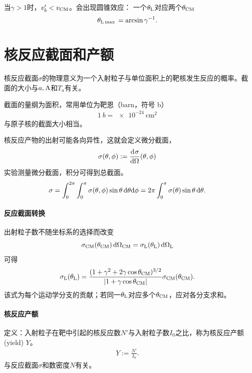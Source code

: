 当$\gamma > 1$时，$v_b' < v_{\mathrm{CM}}$。会出现圆锥效应：
一个$\theta_\mathrm L$对应两个$\theta_{\mathrm{CM}}$
\[
	\theta_{\mathrm L\max{}} = \arcsin\gamma^{-1}.
\]
\begin{notecaptionblock}
\end{notecaptionblock}

\section{核反应截面和产额}
核反应截面$\sigma$的物理意义为一个入射粒子与单位面积上的靶核发生反应的概率。截面的大小与$a,\mathrm{A}$和$T_a$有关。

截面的量纲为面积，常用单位为靶恩（barn，符号 \unit{b}）
\begin{align}
	\qty{1}{b} = \qty{e-24}{\centi\metre\squared}
\end{align}
与原子核的截面大小相当。

核反应产物的出射可能各向异性，这就会定义微分截面，
\begin{align}
	\sigma(\theta,\phi) := \frac{\mathop{}\!\mathrm{d}^{}\sigma}{\mathrm{d}{\Omega}^{}}(\theta,\phi)
\end{align}
实验测量微分截面，积分可得到总截面。
\begin{equation}\label{eq:nrd-integrated-cross-section}
	\sigma = \int_0^{2\pi}\int_0^\pi\sigma(\theta,\phi)\sin\theta\mathop{}\!\mathrm{d}\theta\mathrm{d}\phi = 2\pi\int_0^\pi\sigma(\theta)\sin\theta\mathop{}\!\mathrm{d}\theta.
\end{equation}
\paragraph{反应截面转换}出射粒子数不随坐标系的选择而改变
\begin{equation}\label{eq:nrd-frame-invariant-event-count}
	\sigma_{\mathrm{CM}}(\theta_{\mathrm{CM}})\mathop{}\!\mathrm{d}\Omega_{\mathrm{CM}} = \sigma_\mathrm L(\theta_\mathrm L)\mathop{}\!\mathrm{d}\Omega_\mathrm L
\end{equation}
可得
\begin{equation}\label{eq:nrd-cross-section-frame-change}
	\sigma_\mathrm L(\theta_\mathrm L) = \frac{(1 + \gamma^2 + 2\gamma\cos\theta_{\mathrm{CM}})^{3/2}}{\lvert1 + \gamma\cos\theta_{\mathrm{CM}}\rvert}\sigma_{\mathrm{CM}}(\theta_{\mathrm{CM}}).
\end{equation}
该式为每个运动学分支的贡献；若同一$\theta_\mathrm L$对应多个$\theta_{\mathrm{CM}}$，应对各分支求和。
\paragraph{核反应产额}定义：入射粒子在靶中引起的核反应数$N'$与入射粒子数$I_0$之比，称为核反应产额(yield) $Y$。
\begin{align}
	Y := \frac{N'}{I_0}.
\end{align}
与反应截面$\sigma$和数密度$N$有关。

